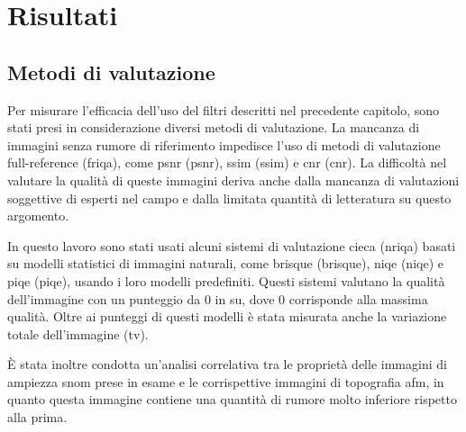 \documentclass[../main.tex]{subfiles}
\begin{document}
\chapter{Risultati}

\section{Metodi di valutazione}

Per misurare l'efficacia dell'uso del filtri descritti nel precedente capitolo, sono stati presi in considerazione diversi metodi di valutazione. La mancanza di immagini senza rumore di riferimento impedisce l'uso di metodi di valutazione full-reference (\acrshort{friqa}), come \acrshort{psnr}\cite{korhonen_2012} (\acrlong{psnr}), \acrshort{ssim}\cite{wang_2004} (\acrlong{ssim}) e \acrshort{cnr}\cite{rodriguez_2018} (\acrlong{cnr}). La difficoltà nel valutare la qualità di queste immagini deriva anche dalla mancanza di valutazioni soggettive di esperti nel campo e dalla limitata quantità di letteratura su questo argomento.

In questo lavoro sono stati usati alcuni sistemi di valutazione cieca (\acrshort{nriqa}) basati su modelli statistici di immagini naturali, come \acrshort{brisque}\cite{mittal_2011} (\acrlong{brisque}), \acrshort{niqe}\cite{mittal_2013} (\acrlong{niqe}) e \acrshort{piqe}\cite{venkatanath_2015} (\acrlong{piqe}), usando i loro modelli predefiniti. Questi sistemi valutano la qualità dell'immagine con un punteggio da 0 in su, dove 0 corrisponde alla massima qualità. Oltre ai punteggi di questi modelli è stata misurata anche la variazione totale dell'immagine (\acrshort{tv}).

È stata inoltre condotta un'analisi correlativa tra le proprietà delle immagini di ampiezza \acrshort{snom} prese in esame e le corrispettive immagini di topografia \acrshort{afm}, in quanto questa immagine contiene una quantità di rumore molto inferiore rispetto alla prima.
\end{document}
